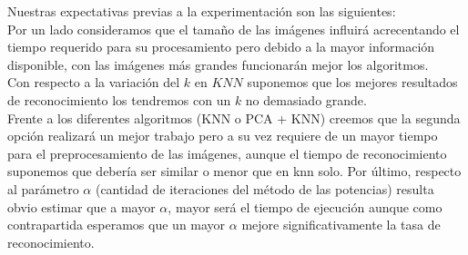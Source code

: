 \par Nuestras expectativas previas a la experimentación son las siguientes:\\
Por un lado consideramos que el tamaño de las im\'agenes influirá acrecentando el tiempo requerido para su procesamiento pero debido a la mayor informaci\'on disponible, con las imágenes más grandes 
funcionarán mejor los algoritmos.\\
Con respecto a la variaci\'on del $k$ en $KNN$ suponemos que los mejores resultados de reconocimiento los tendremos con un $k$ no demasiado grande.\\
Frente a los diferentes algoritmos (KNN o PCA + KNN) creemos que la segunda opci\'on realizar\'a un mejor trabajo pero a su vez requiere de un mayor tiempo para el preprocesamiento de las imágenes, aunque el tiempo de reconocimiento suponemos que debería ser similar o menor que en knn solo.
Por \'ultimo, respecto al par\'ametro $\alpha$ (cantidad de iteraciones del m\'etodo de las potencias) resulta obvio estimar que a mayor $\alpha$, mayor ser\'a el tiempo de ejecución aunque como contrapartida esperamos que un mayor $\alpha$ mejore significativamente la tasa de reconocimiento.

